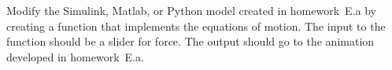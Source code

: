
Modify the Simulink, Matlab, or Python model created in homework~E.a by creating a function that implements the equations of motion.  The input to the function should be a slider for force.  The output should go to the animation developed in homework~E.a.
